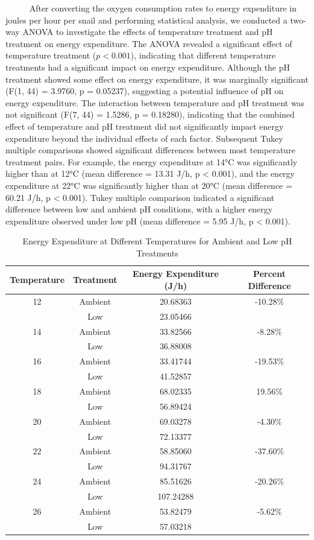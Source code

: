\documentclass[
  12pt,
]{article}
\begin{document}
~~~~~ After converting the oxygen consumption rates to energy
expenditure in joules per hour per snail and performing statistical
analysis, we conducted a two-way ANOVA to investigate the effects of
temperature treatment and pH treatment on energy expenditure. The ANOVA
revealed a significant effect of temperature treatment (\(p < 0.001\)),
indicating that different temperature treatments had a significant
impact on energy expenditure. Although the pH treatment showed some
effect on energy expenditure, it was marginally significant (F(1, 44) =
3.9760, p = 0.05237), suggesting a potential influence of pH on energy
expenditure. The interaction between temperature and pH treatment was
not significant (F(7, 44) = 1.5286, p = 0.18280), indicating that the
combined effect of temperature and pH treatment did not significantly
impact energy expenditure beyond the individual effects of each factor.
Subsequent Tukey multiple comparisons showed significant differences
between most temperature treatment pairs. For example, the energy
expenditure at 14°C was significantly higher than at 12°C (mean
difference = 13.31 J/h, p \textless{} 0.001), and the energy expenditure
at 22°C was significantly higher than at 20°C (mean difference = 60.21
J/h, p \textless{} 0.001). Tukey multiple comparison indicated a
significant difference between low and ambient pH conditions, with a
higher energy expenditure observed under low pH (mean difference = 5.95
J/h, p \textless{} 0.001).

\begin{table}[htbp]
    \centering
    \caption{Energy Expenditure at Different Temperatures for Ambient and Low pH Treatments}
    \label{table3}
    \begin{tabular}{cccc}
    \toprule
    Temperature & Treatment & Energy Expenditure (J/h) & Percent Difference \\
    \midrule
    12 & Ambient & 20.68363 & -10.28\% \\
    & Low & 23.05466 & \\
    14 & Ambient & 33.82566 & -8.28\% \\
    & Low & 36.88008 & \\
    16 & Ambient & 33.41744 & -19.53\% \\
    & Low & 41.52857 & \\
    18 & Ambient & 68.02335 & 19.56\% \\
    & Low & 56.89424 & \\
    20 & Ambient & 69.03278 & -4.30\% \\
    & Low & 72.13377 & \\
    22 & Ambient & 58.85060 & -37.60\% \\
    & Low & 94.31767 & \\
    24 & Ambient & 85.51626 & -20.26\% \\
    & Low & 107.24288 & \\
    26 & Ambient & 53.82479 & -5.62\% \\
    & Low & 57.03218 & \\
    \bottomrule
    \end{tabular}
\end{table}
\end{document}
